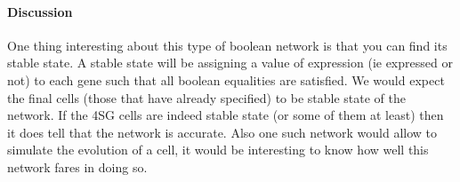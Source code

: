 \documentclass[a4paper,12pt]{book}
\theoremstyle{break}
\begin{document}
\paragraph{Discussion} One thing interesting about this type of boolean network is that you can find its stable state. A stable state will be assigning a value of expression (ie expressed or not) to each gene such that all boolean equalities are satisfied. We would expect the final cells (those that have already specified) to be stable state of the network. If the 4SG cells are indeed stable state (or some of them at least) then it does tell that the network is accurate. Also one such network would allow to simulate the evolution of a cell, it would be interesting to know how well this network fares in doing so.



	
\end{document}
